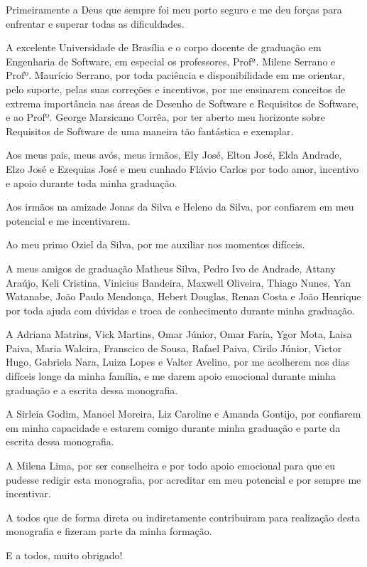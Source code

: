 \begin{agradecimentos}

	Primeiramente a Deus que sempre foi meu porto seguro e me deu forças para enfrentar e superar todas as dificuldades.
	 
	A excelente Universidade de Brasília e o corpo docente de graduação em Engenharia de Software, em especial os professores, Profª. Milene Serrano e Profº. Maurício Serrano, por toda paciência e disponibilidade em me orientar, pelo suporte, pelas suas correções e incentivos, por me ensinarem conceitos de extrema importância nas áreas de Desenho de Software e Requisitos de Software, e ao Profº. George Marsicano Corrêa, por ter aberto meu horizonte sobre Requisitos de Software de uma maneira tão fantástica e exemplar.
	
	Aos meus pais, meus avós, meus irmãos, Ely José, Elton José, Elda Andrade, Elzo José e Ezequias José e meu cunhado Flávio Carlos por todo amor, incentivo e apoio durante toda minha graduação. 
	
	Aos irmãos na amizade Jonas da Silva e Heleno da Silva, por confiarem em meu potencial e me incentivarem. 
	
	Ao meu primo Oziel da Silva, por me auxiliar nos momentos difíceis. 
	
	A meus amigos de graduação Matheus Silva, Pedro Ivo de Andrade, Attany Araújo, Keli Cristina, Vinicius Bandeira, Maxwell Oliveira, Thiago Nunes, Yan Watanabe, João Paulo Mendonça, Hebert Douglas, Renan Costa e João Henrique por toda ajuda com dúvidas e troca de conhecimento durante minha graduação. 
	
	A Adriana Matrins, Vick Martins, Omar Júnior, Omar Faria, Ygor Mota, Laisa Paiva, Maria Walcira, Franscico de Sousa, Rafael Paiva, Cirilo Júnior, Victor Hugo, Gabriela Nara, Luiza Lopes e Valter Avelino, por me acolherem nos dias difíceis longe da minha família,  e me darem apoio emocional durante minha graduação e a escrita dessa monografia. 
	
	A Sirleia Godim, Manoel Moreira, Liz Caroline e Amanda Gontijo, por confiarem em minha capacidade e estarem comigo durante minha graduação e parte da escrita dessa monografia. 
	
	A Milena Lima, por ser conselheira e por todo apoio emocional para que eu pudesse redigir esta monografia, por acreditar em meu potencial e por sempre me incentivar.
	
	A todos que de forma direta ou indiretamente contribuiram para realização desta monografia e fizeram parte da minha formação. 
	
	E a todos, muito obrigado!  
	
\end{agradecimentos}
